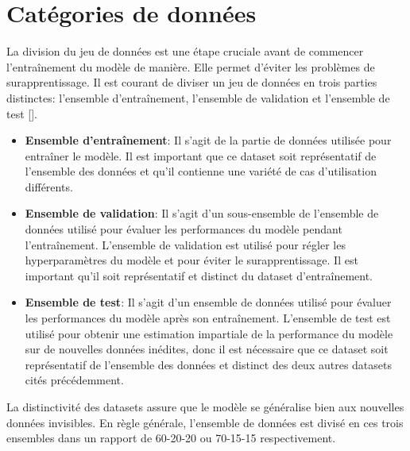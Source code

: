 \section{Catégories de données}
La division du jeu de données est une étape cruciale avant de commencer
l'entraînement du modèle de manière. Elle permet d'éviter les problèmes de
surapprentissage. Il est courant de diviser un jeu de données en trois parties
distinctes: l'ensemble d'entraînement, l'ensemble de validation et l'ensemble
de test [\cite{Goodfellow-et-al-2016}].

\begin{itemize}
	\item \textbf{Ensemble d'entraînement}: Il s'agit de la partie de données utilisée pour entraîner le modèle. Il est important que ce dataset soit représentatif de l'ensemble des données et qu'il contienne une variété de cas d'utilisation différents.

	\item \textbf{Ensemble de validation}: Il s'agit d'un sous-ensemble de l'ensemble de données utilisé pour évaluer les performances du modèle pendant l'entraînement. L'ensemble de validation est utilisé pour régler les hyperparamètres du modèle et pour éviter le surapprentissage. Il est important qu'il soit représentatif et distinct du dataset d'entraînement.

	\item \textbf{Ensemble de test}: Il s'agit d'un ensemble de données utilisé pour évaluer les performances du modèle après son entraînement. L'ensemble de test est utilisé pour obtenir une estimation impartiale de la performance du modèle sur de nouvelles données inédites, donc il est nécessaire que ce dataset soit représentatif de l'ensemble des données et distinct des deux autres datasets cités précédemment.
\end{itemize}
La distinctivité des datasets assure que le modèle se généralise bien aux nouvelles données invisibles. En règle générale, l'ensemble de données est divisé en ces trois ensembles dans un rapport de 60-20-20 ou 70-15-15 respectivement.

